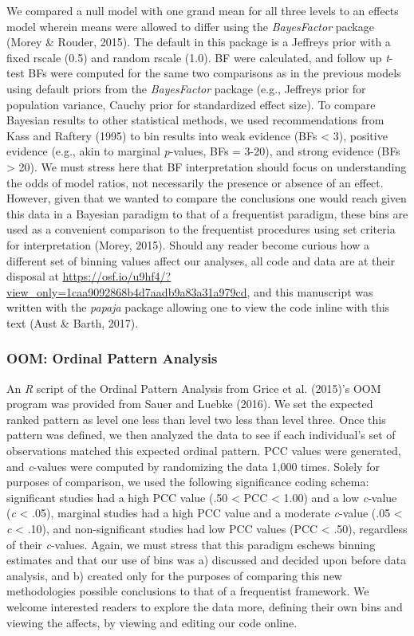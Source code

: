 \documentclass[english,mask,man]{apa6}
\theoremstyle{definition}
\theoremstyle{definition}
\theoremstyle{definition}
\theoremstyle{remark}
\begin{document}
We compared a null model with one grand mean for all three levels to an
effects model wherein means were allowed to differ using the
\emph{BayesFactor} package (Morey \& Rouder, 2015). The default in this
package is a Jeffreys prior with a fixed rscale (0.5) and random rscale
(1.0). BF were calculated, and follow up \emph{t}-test BFs were computed
for the same two comparisons as in the previous models using default
priors from the \emph{BayesFactor} package (e.g., Jeffreys prior for
population variance, Cauchy prior for standardized effect size). To
compare Bayesian results to other statistical methods, we used
recommendations from Kass and Raftery (1995) to bin results into weak
evidence (BFs \textless{} 3), positive evidence (e.g., akin to marginal
\emph{p}-values, BFs = 3-20), and strong evidence (BFs \textgreater{}
20). We must stress here that BF interpretation should focus on
understanding the odds of model ratios, not necessarily the presence or
absence of an effect. However, given that we wanted to compare the
conclusions one would reach given this data in a Bayesian paradigm to
that of a frequentist paradigm, these bins are used as a convenient
comparison to the frequentist procedures using set criteria for
interpretation (Morey, 2015). Should any reader become curious how a
different set of binning values affect our analyses, all code and data
are at their disposal at
\url{https://osf.io/u9hf4/?view_only=1caa9092868b4d7aadb9a83a31a979cd},
and this manuscript was written with the \emph{papaja} package allowing
one to view the code inline with this text (Aust \& Barth, 2017).

\subsubsection{OOM: Ordinal Pattern
Analysis}\label{oom-ordinal-pattern-analysis}

An \emph{R} script of the Ordinal Pattern Analysis from Grice et al.
(2015)'s OOM program was provided from Sauer and Luebke (2016). We set
the expected ranked pattern as level one less than level two less than
level three. Once this pattern was defined, we then analyzed the data to
see if each individual's set of observations matched this expected
ordinal pattern. PCC values were generated, and \emph{c}-values were
computed by randomizing the data 1,000 times. Solely for purposes of
comparison, we used the following significance coding schema:
significant studies had a high PCC value (.50 \textless{} PCC
\textless{} 1.00) and a low \emph{c}-value (\emph{c} \textless{} .05),
marginal studies had a high PCC value and a moderate \emph{c}-value (.05
\textless{} \emph{c} \textless{} .10), and non-significant studies had
low PCC values (PCC \textless{} .50), regardless of their
\emph{c}-values. Again, we must stress that this paradigm eschews
binning estimates and that our use of bins was a) discussed and decided
upon before data analysis, and b) created only for the purposes of
comparing this new methodologies possible conclusions to that of a
frequentist framework. We welcome interested readers to explore the data
more, defining their own bins and viewing the affects, by viewing and
editing our code online.
\end{document}
